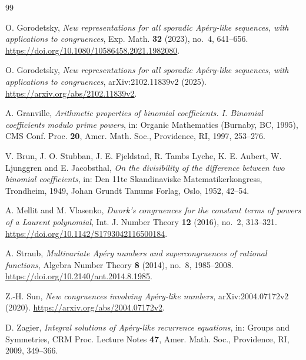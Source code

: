 \documentclass[11pt,reqno]{amsart}
\numberwithin{equation}{section}
\theoremstyle{remark}
\begin{document}
\footnotesize
\begin{thebibliography}{99}

O. Gorodetsky,
\emph{New representations for all sporadic Ap\'ery-like sequences, with
applications to congruences},
Exp. Math. \textbf{32} (2023), no.~4, 641--656.
\url{https://doi.org/10.1080/10586458.2021.1982080}.

O. Gorodetsky,
\emph{New representations for all sporadic Ap\'ery-like sequences, with
applications to congruences},
arXiv:2102.11839v2 (2025).
\url{https://arxiv.org/abs/2102.11839v2}.

A. Granville,
\emph{Arithmetic properties of binomial coefficients. I. Binomial
coefficients modulo prime powers},
in: Organic Mathematics (Burnaby, BC, 1995), CMS Conf. Proc. \textbf{20},
Amer. Math. Soc., Providence, RI, 1997, 253--276.

V. Brun, J. O. Stubban, J. E. Fjeldstad, R. Tambs Lyche, K. E. Aubert,
W. Ljunggren and E. Jacobsthal,
\emph{On the divisibility of the difference between two binomial
coefficients},
in: Den 11te Skandinaviske Matematikerkongress, Trondheim, 1949,
Johan Grundt Tanums Forlag, Oslo, 1952, 42--54.

A. Mellit and M. Vlasenko,
\emph{Dwork's congruences for the constant terms of powers of a Laurent
polynomial},
Int. J. Number Theory \textbf{12} (2016), no.~2, 313--321.
\url{https://doi.org/10.1142/S1793042116500184}.

A. Straub,
\emph{Multivariate Ap\'ery numbers and supercongruences of rational
functions},
Algebra Number Theory \textbf{8} (2014), no.~8, 1985--2008.
\url{https://doi.org/10.2140/ant.2014.8.1985}.

Z.-H. Sun,
\emph{New congruences involving Ap\'ery-like numbers},
arXiv:2004.07172v2 (2020).
\url{https://arxiv.org/abs/2004.07172v2}.

D. Zagier,
\emph{Integral solutions of Ap\'ery-like recurrence equations},
in: Groups and Symmetries, CRM Proc. Lecture Notes \textbf{47},
Amer. Math. Soc., Providence, RI, 2009, 349--366.

\end{thebibliography}
\normalsize
\end{document}
